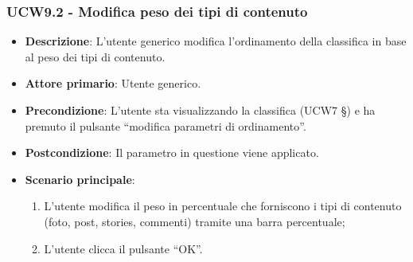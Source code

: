 \subsubsection{UCW9.2 - Modifica peso dei tipi di contenuto}
\begin{itemize}
	\item \textbf{Descrizione}: L'utente generico modifica l'ordinamento della classifica in base al peso dei tipi di contenuto.
    \item \textbf{Attore primario}: Utente generico.
    \item \textbf{Precondizione}: L’utente sta visualizzando la classifica (UCW7 §) e ha premuto il pulsante “modifica parametri di ordinamento”.
    \item \textbf{Postcondizione}: Il parametro in questione viene applicato.
    \item \textbf{Scenario principale}: 
    \begin{enumerate}
        \item L’utente modifica il peso in percentuale che forniscono i tipi di contenuto (foto, post, stories, commenti) tramite una barra percentuale;
        \item L’utente clicca il pulsante “OK”.
    \end{enumerate}
\end{itemize}